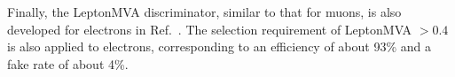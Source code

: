 Finally, the LeptonMVA discriminator, similar to that for muons, is also developed for electrons in Ref.~\cite{PhysRevLett.122.132003}. 
The selection requirement of LeptonMVA $> 0.4$ is also applied to electrons, 
corresponding to an efficiency of about 93\% and a fake rate of about 4\%.

